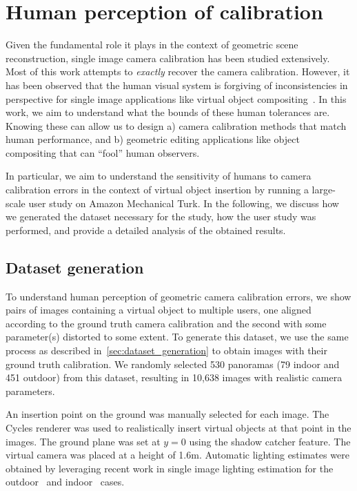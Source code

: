 \section{Human perception of calibration}
\label{sec:human_sensitivity_analysis}

Given the fundamental role it plays in the context of geometric scene reconstruction, single image camera calibration has been studied extensively. Most of this work attempts to \emph{exactly} recover the camera calibration. However, it has been observed that the human visual system is forgiving of inconsistencies in perspective for single image applications like virtual object compositing~\cite{karsch2014automatic}. In this work, we aim to understand what the bounds of these human tolerances are. Knowing these can allow us to design a) camera calibration methods that match human performance, and b) geometric editing applications like object compositing that can ``fool'' human observers.

In particular, we aim to understand the sensitivity of humans to camera calibration errors in the context of virtual object insertion by running a large-scale user study on Amazon Mechanical Turk. In the following, we discuss how we generated the dataset necessary for the study, how the user study was performed, and provide a detailed analysis of the obtained results.


\subsection{Dataset generation}
\label{sec:dataset_organization}

To understand human perception of geometric camera calibration errors, we show pairs of images containing a virtual object to multiple users, one aligned according to the ground truth camera calibration and the second with some parameter(s) distorted to some extent. To generate this dataset, we use the same process as described in~\ref{sec:dataset_generation} to obtain images with their ground truth calibration. We randomly selected 530 panoramas (79 indoor and 451 outdoor) from this dataset, resulting in 10,638 images with realistic camera parameters. 

An insertion point on the ground was manually selected for each image. The Cycles renderer was used to realistically insert virtual objects at that point in the images. The ground plane was set at $y=0$ using the shadow catcher feature. The virtual camera was placed at a height of 1.6m. Automatic lighting estimates were obtained by leveraging recent work in single image lighting estimation for the outdoor~\cite{Hold-Geoffroy2017} and indoor~\cite{Gardner2017} cases. 

